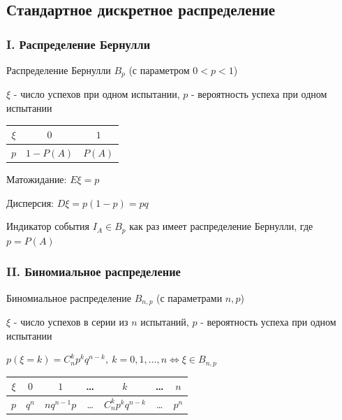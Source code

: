 \documentclass[12pt]{article}
\begin{document}
    \subsection{Стандартное дискретное распределение}

    \subsubsection{I. Распределение Бернулли}

    \hypertarget{bernoullidistribution}{}

    Распределение Бернулли $B_p$ (с параметром $0 < p < 1$)

    $\xi$ - число успехов при одном испытании, $p$ - вероятность успеха при одном испытании
    
    \smallvspace

    \begin{tabular}{c|c|c}
        $\xi$ & $0$        & $1$    \\
        \hline
        $p$   & $1 - P(A)$ & $P(A)$
    \end{tabular}

    \smallvspace

    Матожидание: $E\xi = p$

    Дисперсия: $D\xi = p(1 - p) = pq$

    \Ex Индикатор события $I_A \in B_p$ как раз имеет распределение Бернулли, где $p = P(A)$

    \subsubsection{II. Биномиальное распределение}

    \hypertarget{binomialdistributionproperties}{}

    Биномиальное распределение $B_{n,p}$ (с параметрами $n, p$)

    $\xi$ - число успехов в серии из $n$ испытаний, $p$ - вероятность успеха при одном испытании

    $p(\xi = k) = C^k_n p^k q^{n - k}, \ k = 0, 1, \dots, n \Longleftrightarrow \xi \in B_{n,p}$

    \smallvspace

    \begin{tabular}{c|c|c|c|c|c|c}
        $\xi$ & $0$        & $1$ & \dots & $k$ & \dots & $n$    \\
        \hline
        $p$   & $q^n$ & $n q^{n - 1} p$ & \dots & $C^k_n p^k q^{n - k}$ & \dots & $p^n$
    \end{tabular}
\end{document}
